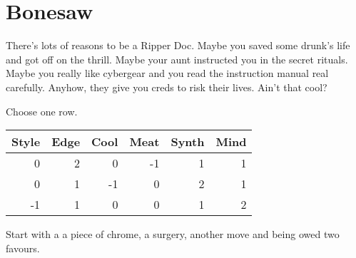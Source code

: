 \documentclass{tufte-book}
\begin{document}



\section{Bonesaw} \label{sec:Bonesaw}

There's lots of reasons to be a Ripper Doc. Maybe you saved some drunk's life and got off on the thrill. Maybe your aunt instructed you in the secret rituals. Maybe you really like cybergear and you read the instruction manual real carefully. Anyhow, they give you creds to risk their lives. Ain't that cool?


Choose one row.
\begin{table}[ht]
\centering
{}\selectfont
\begin{tabular}{rrrrrr}
\toprule
Style & Edge & Cool & Meat & Synth & Mind\\
\midrule
0&2&0&-1&1&1\\
0&1&-1&0&2&1\\
-1&1&0&0&1&2\\
\bottomrule
\end{tabular}
\end{table}

Start with a a piece of chrome, a surgery, another move and being owed two favours. 
\end{document}
